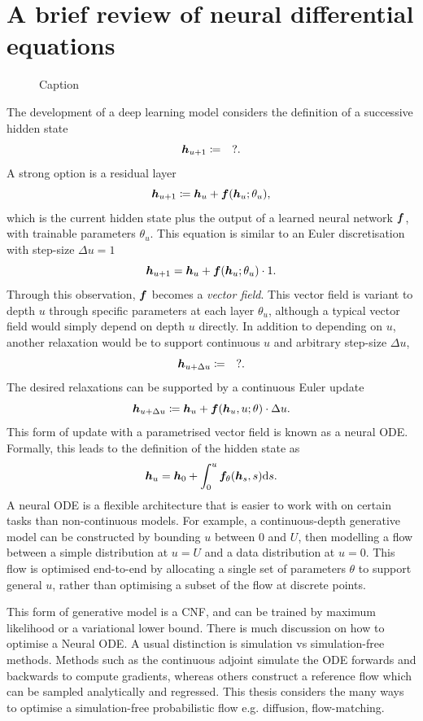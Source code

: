 
\section{A brief review of neural differential equations}
\begin{figure}
    \centering
    \caption{Caption}
    \label{fig:nde_overview}
\end{figure}
The development of a deep learning model considers the definition of a successive hidden state
\[
{\bm{h}}_{u+1} \coloneqq \quad ?.
\]
A strong option is a residual layer
\[
{\bm{h}}_{u+1} \coloneqq {\bm{h}}_u + {\bm{f}}({\bm{h}}_u; \theta_u),
\]
which is the current hidden state plus the output of a learned neural network ${\bm{f}}$, with trainable parameters $\theta_u$. This equation is similar to an Euler discretisation with step-size $\Delta u = 1$
\[
{\bm{h}}_{u+1} = {\bm{h}}_u + {\bm{f}}({\bm{h}}_u; \theta_u)\cdot 1.
\]
Through this observation, ${\bm{f}}$ becomes a \textit{vector field}. This vector field is variant to depth $u$ through specific parameters at each layer $\theta_u$, although a typical vector field would simply depend on depth $u$ directly. In addition to depending on $u$, another relaxation would be to support continuous $u$ and arbitrary step-size $\Delta u$,
\[
{\bm{h}}_{u+\Delta u} \coloneq \quad ?.
\]
The desired relaxations can be supported by a continuous Euler update
\[
{\bm{h}}_{u+\Delta u} \coloneq {\bm{h}}_u + {\bm{f}}({\bm{h}}_u, u; \theta)\cdot \Delta u.
\]
This form of update with a parametrised vector field is known as a neural \ac{ODE}. Formally, this leads to the definition of the hidden state as
\[
{\bm{h}}_u = {\bm{h}}_0 + \int_0^u{\bm{f}}_\theta({\bm{h}}_s, s)\mathrm{d} s.
\label{eq:cnf}
\]
A neural \ac{ODE} is a flexible architecture that is easier to work with on certain tasks than non-continuous models. For example, a continuous-depth generative model can be constructed by bounding $u$ between 0 and $U$, then modelling a flow between a simple distribution at $u=U$ and a data distribution at $u=0$. This flow is optimised end-to-end by allocating a single set of parameters $\theta$ to support general $u$, rather than optimising a subset of the flow at discrete points.

%
This form of generative model is a \ac{CNF}, and can be trained by maximum likelihood or a variational lower bound. There is much discussion on how to optimise a Neural \ac{ODE}. A usual distinction is simulation vs simulation-free methods. Methods such as the continuous adjoint simulate the \ac{ODE} forwards and backwards to compute gradients, whereas others construct a reference flow which can be sampled analytically and regressed. This thesis considers the many ways to optimise a simulation-free probabilistic flow e.g. diffusion, flow-matching.


